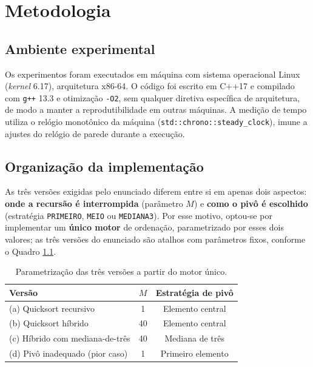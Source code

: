 \chapter{Metodologia}
\label{cap:metodologia}

\section{Ambiente experimental}

Os experimentos foram executados em máquina com sistema operacional Linux
(\textit{kernel} 6.17), arquitetura x86-64. O código foi escrito em C++17 e
compilado com \texttt{g++} 13.3 e otimização \texttt{-O2}, sem qualquer diretiva
específica de arquitetura, de modo a manter a reprodutibilidade em outras máquinas.
A medição de tempo utiliza o relógio monotônico da máquina
(\texttt{std::chrono::steady\-\_clock}), imune a ajustes do relógio de parede
durante a execução.

\section{Organização da implementação}

As três versões exigidas pelo enunciado diferem entre si em apenas dois aspectos:
\textbf{onde a recursão é interrompida} (parâmetro $M$) e \textbf{como o pivô é
escolhido} (estratégia \texttt{PRIMEIRO}, \texttt{MEIO} ou \texttt{MEDIANA3}). Por
esse motivo, optou-se por implementar um \textbf{único motor} de ordenação,
parametrizado por esses dois valores; as três versões do enunciado são atalhos com
parâmetros fixos, conforme o Quadro \ref{tab:versoes}.

\begin{table}[H]
\centering
\caption{Parametrização das três versões a partir do motor único.}
\label{tab:versoes}
\begin{tabular}{lcc}
\hline
\textbf{Versão} & \textbf{$M$} & \textbf{Estratégia de pivô} \\
\hline
(a) Quicksort recursivo & 1 & Elemento central \\
(b) Quicksort híbrido & 40 & Elemento central \\
(c) Híbrido com mediana-de-três & 40 & Mediana de três \\
\hline
(d) Pivô inadequado (pior caso) & 1 & Primeiro elemento \\
\hline
\end{tabular}
\end{table}

